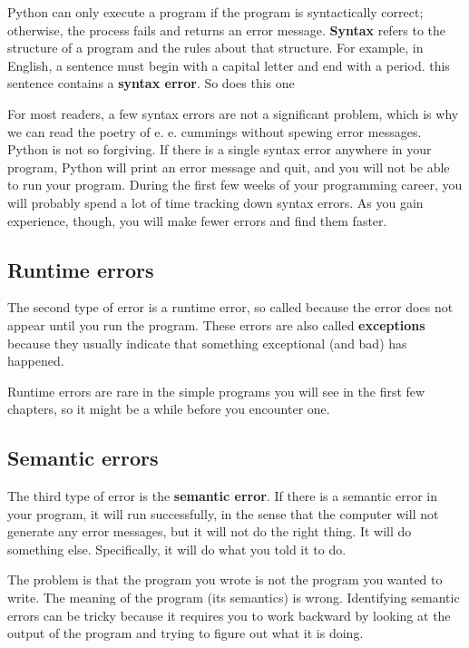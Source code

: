 Python can only execute a program if the program is syntactically
correct; otherwise, the process fails and returns an error message.
{\bf Syntax} refers to the structure of a program and the rules about
that structure.  For example, in English, a sentence must
begin with a capital letter and end with a period.  this sentence contains
a {\bf syntax error}.  So does this one

For most readers, a few syntax errors are not a significant problem,
which is why we can read the poetry of e. e. cummings without spewing error
messages.  Python is not so forgiving.  If there is a single syntax error
anywhere in your program, Python will print an error message and quit,
and you will not be able to run your program. During the first few weeks
of your programming career, you will probably spend a lot of time tracking
down syntax errors.  As you gain experience, though, you will make fewer
errors and find them faster.

\subsection{Runtime errors}
\label{runtime}

The second type of error is a runtime error, so called because the
error does not appear until you run the program.  These errors are also
called {\bf exceptions} because they usually indicate that something
exceptional (and bad) has happened.

Runtime errors are rare in the simple programs you will see in the
first few chapters, so it might be a while before you encounter one.


\subsection{Semantic errors}

The third type of error is the {\bf semantic error}.  If there is a
semantic error in your program, it will run successfully, in the sense
that the computer will not generate any error messages, but it will
not do the right thing.  It will do something else.  Specifically, it
will do what you told it to do.

The problem is that the program you wrote is not the program you
wanted to write.  The meaning of the program (its semantics) is wrong.
Identifying semantic errors can be tricky because it requires you to work
backward by looking at the output of the program and trying to figure
out what it is doing.

